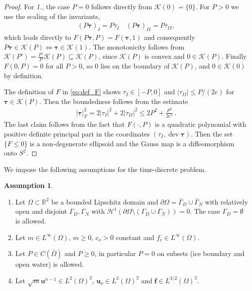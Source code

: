 \documentclass{article}
\theoremstyle{definition}
\newtheorem{assumption}[definition]{Assumption}
\newcommand{\bfu}{\boldsymbol{u}}
\newcommand{\bftau}{\boldsymbol{\tau}}
\newcommand{\bff}{\boldsymbol{f}}
\newcommand{\K}{\mathcal{K}}
\DeclareMathOperator{\dev}{dev}
\begin{document}
\begin{proof}
    For \textit{1.}, the case $P=0$ follows directly from $\K(0)=\{0\}$.
    For $P>0$ we use the scaling of the invariants,
    \begin{align*}
        (P\bftau)_I = P\tau_I \quad (P\bftau)_{II} = P\tau_{II},
    \end{align*}
    which leads directly to $F(P\bftau, P) = F(\bftau, 1)$ and consequently $P\bftau \in \K(P) \Leftrightarrow \bftau \in \K(1)$. The monotonicity
    follows from $\K(P') = \frac{P'}{P}\K(P) \subseteq \K(P)$, since $\K(P)$ is convex and $0\in\K(P)$. Finally $F(0, P) = 0$ for all $P>0$, so $0$ lies on the boundary of $\K(P)$, and $0\in \K(0)$ by definition.

    The definition of $F$ in \eqref{eq:def_F} shows $\tau_I \in [-P,0]$ and $|\tau_{II}|\leq P/(2e)$ for $\bftau \in \K(P)$. Then the boundedness follows from the estimate
    \begin{align*}
        |\bftau|_F^2 = 2|\tau_I|^2 + 2|\tau_{II}|^2 \leq 2 P^2 + \frac{P^2}{2e^2} \ .
    \end{align*}
    The last claim follows from the fact that $F(\cdot, P)$ is a quadratic polynomial with positive definite principal part in the coordinates $(\tau_I, \dev\bftau)$. Then the set $\{F\leq 0\}$ is a non-degenerate ellipsoid and the Gauss map is a diffeomorphism onto $S^2$.
\end{proof}
We impose the following assumptions for the time-discrete problem.
\begin{assumption}\label{ass}
    \begin{enumerate}
        \item[(A1)] Let $\Omega \subset \mathbb R^2$ be a bounded Lipschitz domain and $\partial \Omega = \bar \Gamma_D \cup \bar \Gamma_N$ with relatively open and disjoint $\Gamma_D, \Gamma_N$ with $\mathcal{H}^1(\partial \Omega \setminus (\Gamma_D \cup \Gamma_N))=0$. The case $\Gamma_D = \emptyset$ is allowed.
        \item[(A2)] Let $m \in L^\infty(\Omega)$, $m\geq 0$, $c_o>0$ constant and $f_c \in L^\infty(\Omega)$.
        \item[(A3)] Let $P \in C(\bar \Omega)$ and $P\geq0$, in particular $P=0$
        on subsets (ice boundary and open water) is allowed.
        \item[(A4)] Let $\sqrt{m} \bfu^{n-1} \in L^2(\Omega)^2$, $\bfu_o \in L^3(\Omega)^2$ and $\bff \in L^{3/2}(\Omega)^2$.
    \end{enumerate}
\end{assumption}
\end{document}
